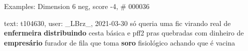 \begin{frame}{Examples: Dimension 6 neg, score -4, \# 000036}
\footnotesize
\begin{alertblock}{text: t104630, user: \_LBrz\_, 2021-03-30}
só queria uma fic virando real de \textbf{enfermeira} \textbf{distribuindo} 
cesta básica e pff2 pras quebradas com dinheiro de \textbf{empresário} furador 
de fila que toma \textbf{soro} fisiológico achando que é vacina 
\end{alertblock}
\end{frame}
